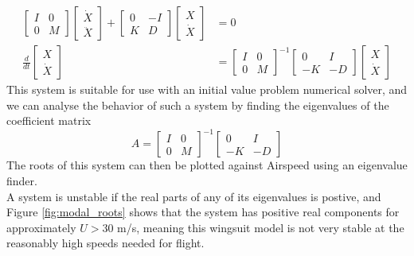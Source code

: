\documentclass[11pt]{article}
\begin{document}
\begin{align*}
  \begin{bmatrix}
    I&0\\
    0&M
  \end{bmatrix}
  \begin{bmatrix}
    \dot{X}\\
    \ddot{X}
  \end{bmatrix}
  +
  \begin{bmatrix}
    0&-I\\
    K&D
  \end{bmatrix}
  \begin{bmatrix}
    X\\
    \dot{X}
  \end{bmatrix}
  &=0
  \\
  \frac{d}{dt}
  \begin{bmatrix}
    X\\
    \dot{X}
  \end{bmatrix}
  &=
  \begin{bmatrix}
    I&0\\
    0&M
  \end{bmatrix}^{-1}
  \begin{bmatrix}
    0&I\\
    -K&-D
  \end{bmatrix}
  \begin{bmatrix}
    X\\
    \dot{X}
  \end{bmatrix}
\end{align*}
This system is suitable for use with an initial value problem numerical solver, and we can analyse the behavior of such a system by finding the eigenvalues of the coefficient matrix
$$
  A = 
  \begin{bmatrix}
    I&0\\
    0&M
  \end{bmatrix}^{-1}
  \begin{bmatrix}
    0&I\\
    -K&-D
  \end{bmatrix}
$$
The roots of this system can then be plotted against Airspeed using an eigenvalue finder. \\
A system is unstable if the real parts of any of its eigenvalues is postive, and Figure \ref{fig:modal_roots} shows that the system has positive real components for approximately $U > 30$ m/s, meaning this wingsuit model is not very stable at the reasonably high speeds needed for flight.
\end{document}
